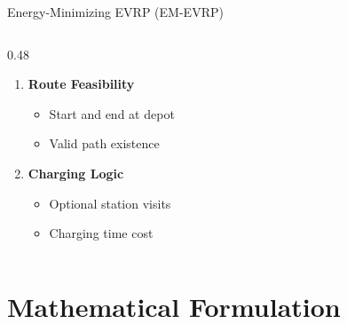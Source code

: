 \documentclass[aspectratio=169,11pt]{beamer}
\begin{document}
\begin{frame}{Energy-Minimizing EVRP (EM-EVRP)}
\begin{columns}[T]
\begin{column}{0.48\textwidth}
\begin{enumerate}
                \item \textbf{Route Feasibility}
                \begin{itemize}
                    \item Start and end at depot
                    \item Valid path existence
                \end{itemize}
                
                \item \textbf{Charging Logic}
                \begin{itemize}
                    \item Optional station visits
                    \item Charging time cost
                \end{itemize}
            \end{enumerate}
        \end{column}
    \end{columns}
\end{frame}


\section{Mathematical Formulation}
\end{document}
